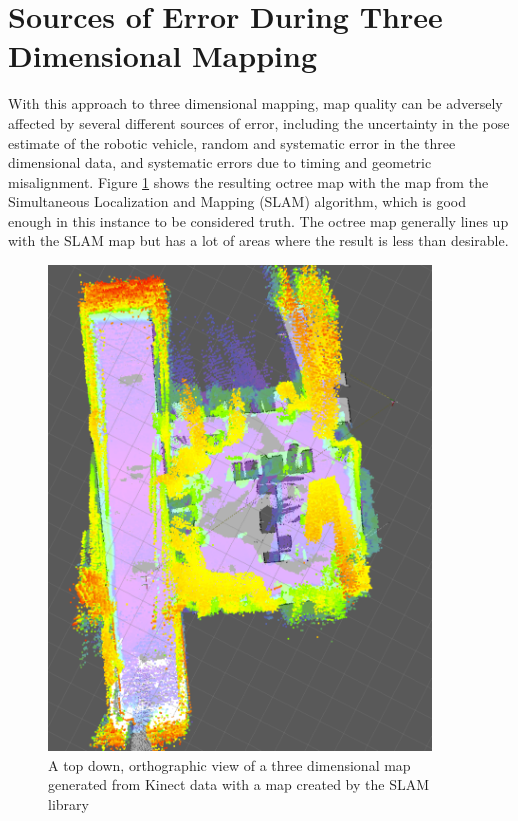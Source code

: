 \documentclass[12pt]{report}
\begin{document}
\section{Sources of Error During Three Dimensional Mapping}
With this approach to three dimensional mapping, map quality can be adversely affected by several different sources of error, including the uncertainty in the pose estimate of the robotic vehicle, random and systematic error in the three dimensional data, and systematic errors due to timing and geometric misalignment.  Figure \ref{fig:slamvsoctree} shows the resulting octree map with the map from the Simultaneous Localization and Mapping (SLAM) algorithm, which is good enough in this instance to be considered truth. The octree map generally lines up with the SLAM map but has a lot of areas where the result is less than desirable.

\begin{figure}[ht]
  \centering
  \includegraphics[width=4in,keepaspectratio]{slamvsoctree.pdf}
  \caption{A top down, orthographic view of a three dimensional map generated from Kinect data with a map created by the SLAM library}
  \label{fig:slamvsoctree}
\end{figure}
\end{document}
